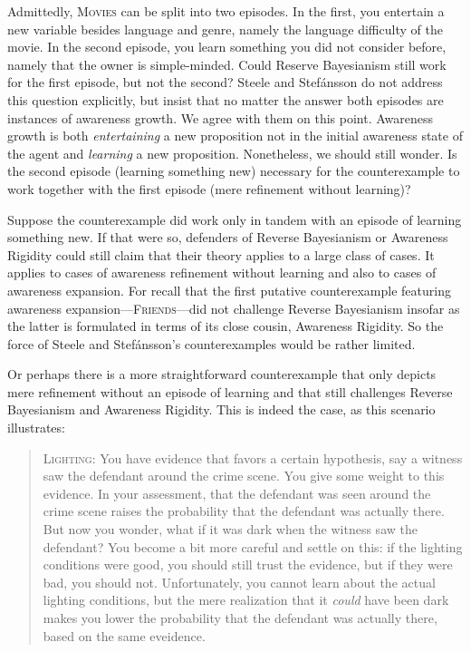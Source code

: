 \documentclass[
  11pt,
  dvipsnames,enabledeprecatedfontcommands]{scrartcl}
\begin{document}
\noindent  Admittedly, \textsc{Movies} can be split into two episodes.
In the first, you entertain a new variable besides language and genre,
namely the language difficulty of the movie. In the second episode, you
learn something you did not consider before, namely that the owner is
simple-minded. Could Reserve Bayesianism still work for the first
episode, but not the second? Steele and Stefánsson do not address this
question explicitly, but insist that no matter the answer both episodes
are instances of awareness growth. We agree with them on this point.
Awareness growth is both \textit{entertaining} a new proposition not in
the initial awareness state of the agent and \textit{learning} a new
proposition. Nonetheless, we should still wonder. Is the second episode
(learning something new) necessary for the counterexample to work
together with the first episode (mere refinement without learning)?

Suppose the counterexample did work only in tandem with an episode of
learning something new. If that were so, defenders of Reverse
Bayesianism or Awareness Rigidity could still claim that their theory
applies to a large class of cases. It applies to cases of awareness
refinement without learning and also to cases of awareness expansion.
For recall that the first putative counterexample featuring awareness
expansion---\textsc{Friends}---did not challenge Reverse Bayesianism
insofar as the latter is formulated in terms of its close cousin,
Awareness Rigidity. So the force of Steele and Stefánsson's
counterexamples would be rather limited.

Or perhaps there is a more straightforward counterexample that only
depicts mere refinement without an episode of learning and that still
challenges Reverse Bayesianism and Awareness Rigidity. This is indeed
the case, as this scenario illustrates:

\begin{quote}
\textsc{Lighting:} You have evidence that favors a certain hypothesis,
say a witness saw the defendant around the crime scene. You give some
weight to this evidence. In your assessment, that the defendant was seen
around the crime scene raises the probability that the defendant was
actually there. But now you wonder, what if it was dark when the witness
saw the defendant? You become a bit more careful and settle on this: if
the lighting conditions were good, you should still trust the evidence,
but if they were bad, you should not. Unfortunately, you cannot learn
about the actual lighting conditions, but the mere realization that it
\textit{could} have been dark makes you lower the probability that the
defendant was actually there, based on the same eveidence.
\end{quote}
\end{document}
